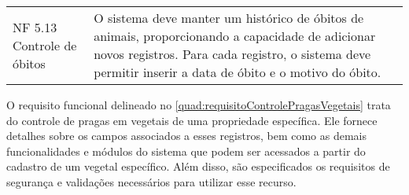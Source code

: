 \begin{tabframed}[!htb]
\begin{tabular}{|l|l|}
    \multicolumn{1}{|p{3cm}|}{\raggedright NF 5.13 Controle de óbitos}      &
    \multicolumn{1}{|p{12cm}|}{\raggedright O sistema deve manter um histórico de óbitos de animais, proporcionando a capacidade de adicionar novos registros. Para cada registro, o sistema deve permitir inserir a data de óbito e o motivo do óbito.}
    \\ \cline{1-2}
  \end{tabular}
  \fonte{} %
\end{tabframed}

\clearpage

O requisito funcional delineado no \autoref{quad:requisitoControlePragasVegetais} trata do controle de pragas em vegetais de uma propriedade específica. Ele fornece detalhes sobre os campos associados a esses registros, bem como as demais funcionalidades e módulos do sistema que podem ser acessados a partir do cadastro de um vegetal específico. Além disso, são especificados os requisitos de segurança e validações necessários para utilizar esse recurso.

